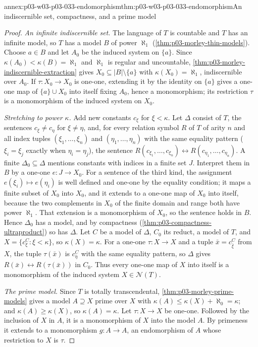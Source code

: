 \begin{annexitem}{annex:p03-w03-p03-033-endomorphism}{thm:p03-w03-p03-033-endomorphism}{An indiscernible set, compactness, and a prime model}
\begin{proof}
\emph{An infinite indiscernible set.} The language of \(T\) is countable
and \(T\) has an infinite model, so \(T\) has a model \(B\) of power
\(\aleph_1\) (\cref{thm:p03-morley-thin-models}). Choose \(a\in B\) and let
\(A_0\) be the induced system on \(\{a\}\). Since
\(\kappa(A_0)<\kappa(B)=\aleph_1\) and \(\aleph_1\) is regular and
uncountable, \cref{thm:p03-morley-indiscernible-extraction} gives
\(X_0\subseteq|B|\setminus\{a\}\) with \(\kappa(X_0)=\aleph_1\),
indiscernible over \(A_0\). If \(\tau:X_0\to X_0\) is one-one, extending
it by the identity on \(\{a\}\) gives a one-one map of
\(\{a\}\cup X_0\) into itself fixing \(A_0\), hence a monomorphism; its
restriction \(\tau\) is a monomorphism of the induced system on \(X_0\).

\emph{Stretching to power \(\kappa\).} Add new constants \(c_\xi\) for
\(\xi<\kappa\). Let \(\Delta\) consist of \(T\), the sentences
\(c_\xi\ne c_\eta\) for \(\xi\ne\eta\), and, for every relation symbol
\(R\) of \(T\) of arity \(n\) and all index tuples
\((\xi_1,\dots,\xi_n)\) and \((\eta_1,\dots,\eta_n)\) with the same
equality pattern (\(\xi_i=\xi_j\) exactly when \(\eta_i=\eta_j\)), the
sentence
\(R(c_{\xi_1},\dots,c_{\xi_n})\leftrightarrow
  R(c_{\eta_1},\dots,c_{\eta_n})\).
A finite \(\Delta_0\subseteq\Delta\) mentions constants with indices in a
finite set \(J\). Interpret them in \(B\) by a one-one \(e:J\to X_0\). For
a sentence of the third kind, the assignment \(e(\xi_i)\mapsto e(\eta_i)\)
is well defined and one-one by the equality condition; it maps a finite
subset of \(X_0\) into \(X_0\), and it extends to a one-one map of \(X_0\)
into itself, because the two complements in \(X_0\) of the finite domain
and range both have power \(\aleph_1\). That extension is a monomorphism
of \(X_0\), so the sentence holds in \(B\). Hence \(\Delta_0\) has a model,
and by compactness (\cref{thm:p03-compactness-ultraproduct}) so has
\(\Delta\). Let \(C\) be a model of \(\Delta\), \(C_0\) its reduct, a
model of \(T\), and \(X=\{c_\xi^C:\xi<\kappa\}\), so \(\kappa(X)=\kappa\).
For a one-one \(\tau:X\to X\) and a tuple \(\bar x=c_{\bar\xi}^C\) from
\(X\), the tuple \(\tau(\bar x)\) is \(c_{\bar\eta}^C\) with the same
equality pattern, so \(\Delta\) gives
\(R(\bar x)\leftrightarrow R(\tau(\bar x))\) in \(C_0\). Thus every
one-one map of \(X\) into itself is a monomorphism of the induced system
\(X\in\mathcal N(T)\).

\emph{The prime model.} Since \(T\) is totally transcendental,
\cref{thm:p03-morley-prime-models} gives a model \(A\supseteq X\) prime
over \(X\) with \(\kappa(A)\leq\kappa(X)+\aleph_0=\kappa\); and
\(\kappa(A)\geq\kappa(X)\), so \(\kappa(A)=\kappa\). Let \(\tau:X\to X\)
be one-one. Followed by the inclusion of \(X\) in \(A\), it is a
monomorphism of \(X\) into the model \(A\). By primeness it extends to a
monomorphism \(g:A\to A\), an endomorphism of \(A\) whose restriction to
\(X\) is \(\tau\).
\end{proof}
\end{annexitem}

